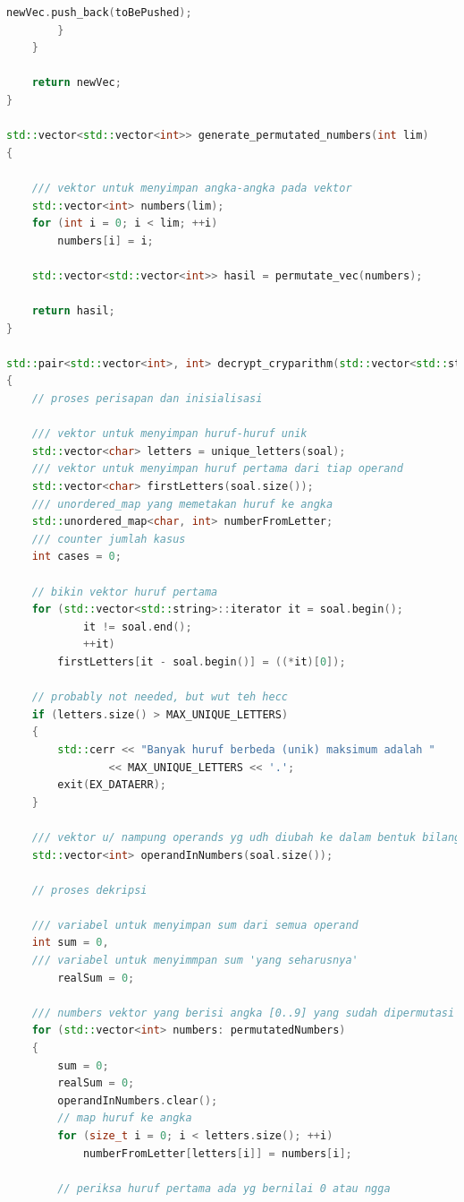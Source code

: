 \documentclass{article}
\begin{document}
\begin{lstlisting}[caption = main.cpp, language = c++]
            newVec.push_back(toBePushed);
        }
    }

    return newVec;
}

std::vector<std::vector<int>> generate_permutated_numbers(int lim)
{

    /// vektor untuk menyimpan angka-angka pada vektor
    std::vector<int> numbers(lim);
    for (int i = 0; i < lim; ++i)
        numbers[i] = i;

    std::vector<std::vector<int>> hasil = permutate_vec(numbers);

    return hasil;
}

std::pair<std::vector<int>, int> decrypt_cryparithm(std::vector<std::string> soal, std::vector<std::vector<int>> permutatedNumbers)
{
    // proses perisapan dan inisialisasi

    /// vektor untuk menyimpan huruf-huruf unik
    std::vector<char> letters = unique_letters(soal);
    /// vektor untuk menyimpan huruf pertama dari tiap operand
    std::vector<char> firstLetters(soal.size());
    /// unordered_map yang memetakan huruf ke angka
    std::unordered_map<char, int> numberFromLetter;
    /// counter jumlah kasus
    int cases = 0;

    // bikin vektor huruf pertama
    for (std::vector<std::string>::iterator it = soal.begin();
            it != soal.end();
            ++it)
        firstLetters[it - soal.begin()] = ((*it)[0]);

    // probably not needed, but wut teh hecc
    if (letters.size() > MAX_UNIQUE_LETTERS)
    {
        std::cerr << "Banyak huruf berbeda (unik) maksimum adalah "
                << MAX_UNIQUE_LETTERS << '.';
        exit(EX_DATAERR);
    }

    /// vektor u/ nampung operands yg udh diubah ke dalam bentuk bilangan
    std::vector<int> operandInNumbers(soal.size());

    // proses dekripsi

    /// variabel untuk menyimpan sum dari semua operand
    int sum = 0,
    /// variabel untuk menyimmpan sum 'yang seharusnya'
        realSum = 0;

    /// numbers vektor yang berisi angka [0..9] yang sudah dipermutasi
    for (std::vector<int> numbers: permutatedNumbers)
    {
        sum = 0;
        realSum = 0;
        operandInNumbers.clear();
        // map huruf ke angka
        for (size_t i = 0; i < letters.size(); ++i)
            numberFromLetter[letters[i]] = numbers[i];

        // periksa huruf pertama ada yg bernilai 0 atau ngga


\end{lstlisting}
\end{document}
